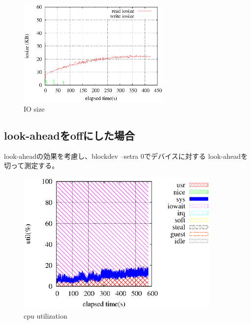 \documentclass[11pt,a4paper]{jsarticle}
\begin{document}
\begin{figure}[thbp]
 \begin{center}
  \includegraphics[width=75mm]{1idxscan_ra2048iosize.eps}
 \end{center}
 \caption{IO size}
 \label{fig:1idx2048iosize}
\end{figure}

\subsection{look-aheadをoffにした場合}
look-aheadの効果を考慮し、blockdev --setra 0でデバイスに対する
look-aheadを切って測定する。
\begin{figure}[thbp]
 \begin{center}
  \includegraphics[width=100mm]{1idxscan_ra0core1.eps}
 \end{center}
 \caption{cpu utilization}
 \label{fig:1idx0core1}
\end{figure}
\end{document}
